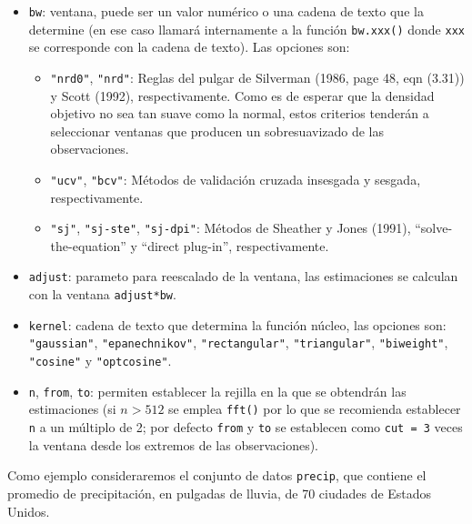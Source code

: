 \documentclass[
]{book}
\theoremstyle{break}
\theoremstyle{nonumberplain}
\begin{document}
\begin{itemize}
\item
  \texttt{bw}: ventana, puede ser un valor numérico o una cadena de texto que la determine
  (en ese caso llamará internamente a la función \texttt{bw.xxx()} donde \texttt{xxx} se corresponde
  con la cadena de texto). Las opciones son:

  \begin{itemize}
  \item
    \texttt{"nrd0"}, \texttt{"nrd"}: Reglas del pulgar de Silverman (1986, page 48, eqn (3.31)) y
    Scott (1992), respectivamente. Como es de esperar que la densidad objetivo
    no sea tan suave como la normal, estos criterios tenderán a seleccionar
    ventanas que producen un sobresuavizado de las observaciones.
  \item
    \texttt{"ucv"}, \texttt{"bcv"}: Métodos de validación cruzada insesgada y sesgada, respectivamente.
  \item
    \texttt{"sj"}, \texttt{"sj-ste"}, \texttt{"sj-dpi"}: Métodos de Sheather y Jones (1991),
    ``solve-the-equation'' y ``direct plug-in'', respectivamente.
  \end{itemize}
\item
  \texttt{adjust}: parameto para reescalado de la ventana, las estimaciones se calculan
  con la ventana \texttt{adjust*bw}.
\item
  \texttt{kernel}: cadena de texto que determina la función núcleo, las opciones son: \texttt{"gaussian"},
  \texttt{"epanechnikov"}, \texttt{"rectangular"}, \texttt{"triangular"}, \texttt{"biweight"}, \texttt{"cosine"} y \texttt{"optcosine"}.
\item
  \texttt{n}, \texttt{from}, \texttt{to}: permiten establecer la rejilla en la que se obtendrán las estimaciones
  (si \(n>512\) se emplea \texttt{fft()} por lo que se recomienda establecer \texttt{n} a un múltiplo de 2;
  por defecto \texttt{from} y \texttt{to} se establecen como \texttt{cut\ =\ 3} veces la ventana desde los extremos
  de las observaciones).
\end{itemize}

Como ejemplo consideraremos el conjunto de datos \texttt{precip}, que contiene el promedio de precipitación,
en pulgadas de lluvia, de 70 ciudades de Estados Unidos.
\end{document}
